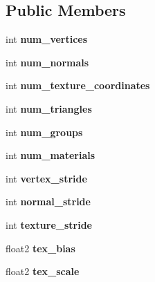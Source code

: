 \subsection*{Public Members}
\begin{DoxyCompactItemize}
\item 
\mbox{\label{struct_mesh_view_a1d2be80f42dd616945403e26351cb035}} 
int {\bfseries num\+\_\+vertices}
\item 
\mbox{\label{struct_mesh_view_a9f722af89780c11bd1fec4fee6ab6a08}} 
int {\bfseries num\+\_\+normals}
\item 
\mbox{\label{struct_mesh_view_a33cad2c7038009342cba62e3ffae964d}} 
int {\bfseries num\+\_\+texture\+\_\+coordinates}
\item 
\mbox{\label{struct_mesh_view_a09b785140c361095c56a0ffcef673538}} 
int {\bfseries num\+\_\+triangles}
\item 
\mbox{\label{struct_mesh_view_a0d44f18a3e788e6973841d26d74571a1}} 
int {\bfseries num\+\_\+groups}
\item 
\mbox{\label{struct_mesh_view_ae8ecdcbccd9ebaaad944a2e2d754f219}} 
int {\bfseries num\+\_\+materials}
\item 
\mbox{\label{struct_mesh_view_a9163977ed16cb879125c876523c8de5b}} 
int {\bfseries vertex\+\_\+stride}
\item 
\mbox{\label{struct_mesh_view_ae72e84a92ade1bcc760c4821bbcf6353}} 
int {\bfseries normal\+\_\+stride}
\item 
\mbox{\label{struct_mesh_view_aed9289964688ae7e4fa2b9f2fa0a9781}} 
int {\bfseries texture\+\_\+stride}
\item 
\mbox{\label{struct_mesh_view_a2016746ef28ae331c0ad382431d86186}} 
float2 {\bfseries tex\+\_\+bias}
\item 
\mbox{\label{struct_mesh_view_a3395a28dbbf37b7d435809122d977c90}} 
float2 {\bfseries tex\+\_\+scale}

\end{DoxyCompactItemize}
